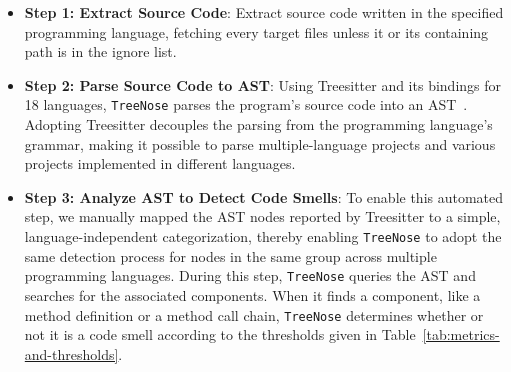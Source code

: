 \begin{itemize}[leftmargin=*]
    \item \textbf{Step 1: Extract Source Code}: Extract source code written in
        the specified programming language, fetching every target files unless
        it or its containing path is in the ignore list.
    \item \textbf{Step 2: Parse Source Code to AST}: Using Treesitter and its
        bindings for 18 languages, \texttt{TreeNose} parses the program's source
        code into an AST~\cite{treeSitter}. Adopting Treesitter decouples the
        parsing from the programming language's grammar, making it possible to
        parse multiple-language projects and various projects implemented in
        different languages.
    \item \textbf{Step 3: Analyze AST to Detect Code Smells}: To enable this
        automated step, we manually mapped the AST nodes reported by Treesitter
        to a simple, language-independent categorization, thereby enabling
        \texttt{TreeNose} to adopt the same detection process for nodes in the
        same group across multiple programming languages. During this step,
        \texttt{TreeNose} queries the AST and searches for the associated
        components. When it finds a component, like a method definition or a
        method call chain, \texttt{TreeNose} determines whether or not it is a
        code smell according to the thresholds given in
        Table~\ref{tab:metrics-and-thresholds}.
\end{itemize}


